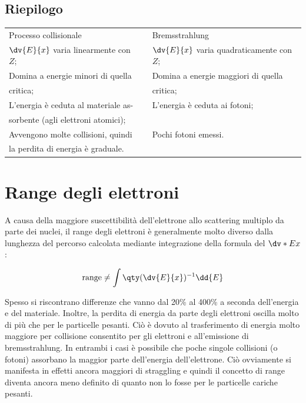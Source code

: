 \newpage

\subsection{Riepilogo}

\begin{center}
    \begin{tabular}{p{6.7cm}p{0.8cm}p{6.7cm}}
        \hspace{1.4cm}Processo collisionale \hspace{2cm} & & \hspace{2cm}Bremsstrahlung\\[0.5cm]
        $\displaystyle \dv{E}{x}$ varia linearmente con $Z$;\footnotemark & & $\displaystyle \dv{E}{x}$ varia quadraticamente con $Z$;\\[0.5cm]
        Domina a energie minori di quella & & Domina a energie maggiori di quella\\
        critica; & & critica;\\[0.2cm]
        L'energia è ceduta al materiale as- & & L'energia è ceduta ai fotoni;\\
        sorbente (agli elettroni atomici); & &\\[0.2cm]
        Avvengono molte collisioni, quindi & & Pochi fotoni emessi.\\
        la perdita di energia è graduale. & &
    \end{tabular}
\end{center}


\section{Range degli elettroni}

A causa della maggiore suscettibilità dell'elettrone allo scattering multiplo da parte dei nuclei, il range degli elettroni è generalmente molto diverso dalla lunghezza del percorso calcolata mediante integrazione della formula del $\dv*{E}{x}$:

\begin{equation*}
    \text{range} \neq \int \qty( \dv{E}{x} )^{-1} \dd{E}
\end{equation*}

Spesso si riscontrano differenze che vanno dal 20\% al 400\% a seconda dell'energia e del materiale. Inoltre, la perdita di energia da parte degli elettroni oscilla molto di più che per le particelle pesanti. Ciò è dovuto al trasferimento di energia molto maggiore per collisione consentito per gli elettroni e all'emissione di bremsstrahlung. In entrambi i casi è possibile che poche singole collisioni (o fotoni) assorbano la maggior parte dell'energia dell'elettrone. Ciò ovviamente si manifesta in effetti ancora maggiori di straggling e quindi il concetto di range diventa ancora meno definito di quanto non lo fosse per le particelle cariche pesanti. %

